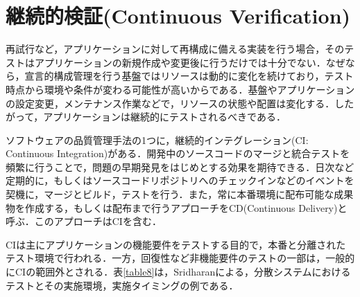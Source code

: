 \documentclass[12pt,a4j]{ujreport}
\begin{document}
\section{継続的検証(Continuous Verification)}
再試行など，アプリケーションに対して再構成に備える実装を行う場合，そのテストはアプリケーションの新規作成や変更後に行うだけでは十分でない．なぜなら，宣言的構成管理を行う基盤ではリソースは動的に変化を続けており，テスト時点から環境や条件が変わる可能性が高いからである．基盤やアプリケーションの設定変更，メンテナンス作業などで，リソースの状態や配置は変化する．したがって，アプリケーションは継続的にテストされるべきである．

ソフトウェアの品質管理手法の1つに，継続的インテグレーション(CI: Continuous Integration)がある\cite{ref40}．開発中のソースコードのマージと統合テストを頻繁に行うことで，問題の早期発見をはじめとする効果を期待できる．日次など定期的に，もしくはソースコードリポジトリへのチェックインなどのイベントを契機に，マージとビルド，テストを行う．また，常に本番環境に配布可能な成果物を作成する，もしくは配布まで行うアプローチをCD(Continuous Delivery)と呼ぶ\cite{ref41}．このアプローチはCIを含む．

CIは主にアプリケーションの機能要件をテストする目的で，本番と分離されたテスト環境で行われる．一方，回復性など非機能要件のテストの一部は，一般的にCIの範囲外とされる．表\ref{table8}は，Sridharanによる，分散システムにおけるテストとその実施環境，実施タイミングの例である\cite{ref42}．
\end{document}
